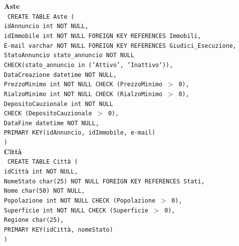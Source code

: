 \documentclass[a4paper,12pt]{report}
\begin{document}
                \noindent
                {\large \textbf{Aste}} \\
                \texttt{
                    CREATE TABLE Aste ( \\
                    \null\quad\quad idAnnuncio          int         NOT NULL, \\
                    \null\quad\quad idImmobile int NOT NULL FOREIGN KEY REFERENCES Immobili, \\
                    \null\quad\quad E-mail varchar NOT NULL FOREIGN KEY REFERENCES Giudici\_Esecuzione, \\
                    \null\quad\quad StatoAnnuncio       stato\_annuncio     NOT NULL \\
                            \null\qquad\qquad CHECK(stato\_annuncio in ('Attivo', 'Inattivo')), \\
                    \null\quad\quad DataCreazione       datetime    NOT NULL, \\
                    \null\quad\quad PrezzoMinimo        int         NOT NULL CHECK (PrezzoMinimo $>$ 0), \\
                    \null\quad\quad RialzoMinimo        int         NOT NULL CHECK (RialzoMinimo $>$ 0), \\
                    \null\quad\quad DepositoCauzionale  int         NOT NULL \\
                            \null\qquad\qquad CHECK (DepositoCauzionale $>$ 0), \\
                    \null\quad\quad DataFine            datetime    NOT NULL, \\
                    \null\quad\quad PRIMARY KEY(idAnnuncio, idImmobile, e-mail) \\
                    )
                } \\

                \noindent
                {\large \textbf{Città}} \\
                \texttt{
                    CREATE TABLE Città ( \\
                    \null\quad\quad idCittà         int         NOT NULL, \\
                    \null\quad\quad NomeStato char(25) NOT NULL FOREIGN KEY REFERENCES Stati, \\
                    \null\quad\quad Nome            char(50)    NOT NULL, \\
                    \null\quad\quad Popolazione     int         NOT NULL CHECK (Popolazione $>$ 0), \\
                    \null\quad\quad Superficie      int         NOT NULL CHECK (Superficie $>$ 0), \\
                    \null\quad\quad Regione         char(25), \\
                    \null\quad\quad PRIMARY KEY(idCittà, nomeStato) \\
                    )
                } \\
\end{document}
